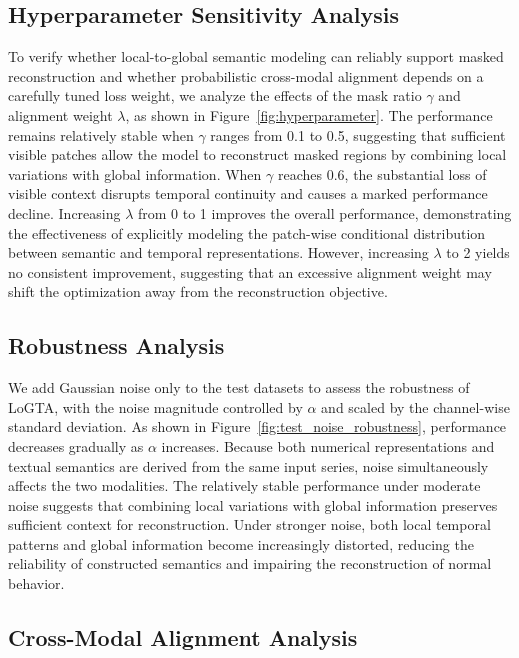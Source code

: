 \documentclass[letterpaper]{article} %
\newcommand{\method}{LoGTA}
\begin{document}
\subsection{Hyperparameter Sensitivity Analysis}

\noindent To verify whether local-to-global semantic modeling can reliably support masked reconstruction and whether probabilistic cross-modal alignment depends on a carefully tuned loss weight, we analyze the effects of the mask ratio $\gamma$ and alignment weight $\lambda$, as shown in Figure~\ref{fig:hyperparameter}. The performance remains relatively stable when $\gamma$ ranges from 0.1 to 0.5, suggesting that sufficient visible patches allow the model to reconstruct masked regions by combining local variations with global information. When $\gamma$ reaches 0.6, the substantial loss of visible context disrupts temporal continuity and causes a marked performance decline. Increasing $\lambda$ from 0 to 1 improves the overall performance, demonstrating the effectiveness of explicitly modeling the patch-wise conditional distribution between semantic and temporal representations. However, increasing $\lambda$ to 2 yields no consistent improvement, suggesting that an excessive alignment weight may shift the optimization away from the reconstruction objective.

\subsection{Robustness Analysis}
\noindent We add Gaussian noise only to the test datasets to assess the robustness of \method{}, with the noise magnitude controlled by $\alpha$ and scaled by the channel-wise standard deviation. As shown in Figure~\ref{fig:test_noise_robustness}, performance decreases gradually as $\alpha$ increases. Because both numerical representations and textual semantics are derived from the same input series, noise simultaneously affects the two modalities. The relatively stable performance under moderate noise suggests that combining local variations with global information preserves sufficient context for reconstruction. Under stronger noise, both local temporal patterns and global information become increasingly distorted, reducing the reliability of constructed semantics and impairing the reconstruction of normal behavior.





\subsection{Cross-Modal Alignment Analysis}
\end{document}
